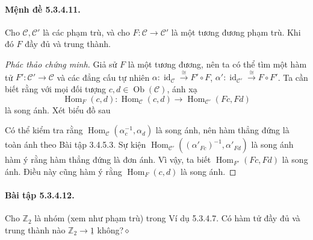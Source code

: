 \paragraph{Mệnh đề 5.3.4.11.} Cho $\mathcal C,\mathcal C'$ là các phạm trù, và cho $F:\mathcal C\to\mathcal C'$ là một tương đương phạm trù. Khi đó $F$ đầy đủ và trung thành.
\begin{proof}[Phác thảo chứng minh]Giả sử $F$ là một tương đương, nên ta có thể tìm một hàm tử $F':\mathcal C'\to\mathcal C$ và các đẳng cấu tự nhiên $\alpha:\operatorname{id}_{\mathcal C}\xrightarrow{\cong}F'\circ F$, $\alpha':\operatorname{id}_{\mathcal C'}\xrightarrow{\cong}F\circ F'$. Ta cần biết rằng với mọi đối tượng $c,d\in\operatorname{Ob}(\mathcal C)$, ánh xạ
\[\operatorname{Hom}_F(c,d):\operatorname{Hom}_{\mathcal C}(c,d)\longrightarrow\operatorname{Hom}_{\mathcal C'}(Fc,Fd)\]
là song ánh. Xét biểu đồ sau
\begin{center}\end{center}
Có thể kiểm tra rằng $\operatorname{Hom}_{\mathcal C}(\alpha_c^{-1},\alpha_d)$ là song ánh, nên hàm thẳng đứng là toàn ánh theo Bài tập 3.4.5.3. Sự kiện $\operatorname{Hom}_{\mathcal C'}((\alpha'_{Fc})^{-1},\alpha'_{Fd})$ là song ánh hàm ý rằng hàm thẳng đứng là đơn ánh. Vì vậy, ta biết $\operatorname{Hom}_{F'}(Fc,Fd)$ là song ánh. Điều này cũng hàm ý rằng $\operatorname{Hom}_F(c,d)$ là song ánh.\end{proof}
\paragraph{Bài tập 5.3.4.12.} Cho $\mathbb Z_2$ là nhóm (xem như phạm trù) trong Ví dụ 5.3.4.7. Có hàm tử đầy đủ và trung thành nào $\mathbb Z_2\to\underline{1}$ không?\hfill$\diamond$
